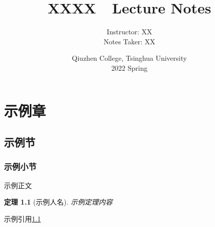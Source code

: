 \documentclass[UTF8,oneside,fontset=founder,11pt]{ctexbook}
\title{
    \huge{XXXX~~Lecture Notes}
    \vspace{0.4\paperheight}
}
\author{
    \Large{Instructor: XX}\\
    \Large{Notes Taker: XX}
    \vspace{0.1\paperheight}
}
\date{
    \Large{Qiuzhen College, Tsinghua University}\\
    \Large{2022 Spring}
}
\theoremstyle{plain}\newtheorem{thm}{定理}
\theoremstyle{definition}\newtheorem{defn}[thm]{定义}
\theoremstyle{plain}\newtheorem{axiom}[thm]{公理}
\theoremstyle{plain}\newtheorem{coro}[thm]{推论}
\theoremstyle{plain}\newtheorem{lemma}[thm]{引理}
\theoremstyle{plain}\newtheorem{prop}[thm]{命题}
\theoremstyle{plain}\newtheorem{conj}[thm]{猜想}
\theoremstyle{plain}\newtheorem{ques}[thm]{问题}
\theoremstyle{plain}\newtheorem{const}[thm]{构造}
\theoremstyle{remark}\newtheorem{notation}[thm]{记号}
\theoremstyle{plain}\newtheorem*{app}{应用}
\theoremstyle{plain}\newtheorem*{exam}{例子}
\theoremstyle{plain}\newtheorem*{exer}{练习}
\theoremstyle{remark}\newtheorem*{remark}{注记}
\theoremstyle{remark}\newtheorem*{note}{\small{附注}}
\numberwithin{equation}{section}
\numberwithin{thm}{section}
\begin{document}
\maketitle
\frontmatter
\tableofcontents
\newpage

\mainmatter{}

\chapter{示例章}
\section{示例节}
\subsection{示例小节}
示例正文
\begin{thm}[示例人名]\label{thm:示例定理}
    示例定理内容
\end{thm}
示例引用\cref{thm:示例定理}


\renewcommand\bibname{参考文献}
\printbibliography{} %
\end{document}
